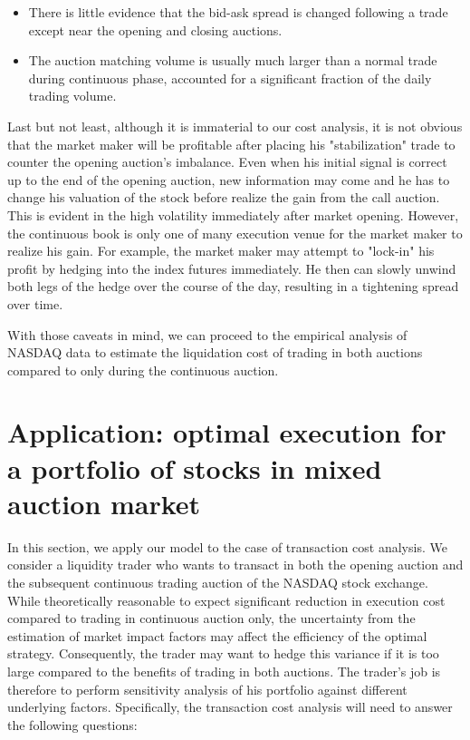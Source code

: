 \documentclass{article}
\begin{document}
\begin{itemize}
  \item There is little evidence that the bid-ask spread is changed following a trade except near the opening and closing auctions.
  \item The auction matching volume is usually much larger than a normal trade during continuous phase, accounted for a significant fraction of the daily trading volume.
\end{itemize}

Last but not least, although it is immaterial to our cost analysis, it is not obvious that the market maker will be profitable after placing his "stabilization" trade to counter the opening auction's imbalance. Even when his initial signal is correct up to the end of the opening auction, new information may come and he has to change his valuation of the stock before realize the gain from the call auction. This is evident in the high volatility immediately after market opening. However, the continuous book is only one of many execution venue for the market maker to realize his gain. For example, the market maker may attempt to "lock-in" his profit by hedging into the index futures immediately. He then can slowly unwind both legs of the hedge over the course of the day, resulting in a tightening spread over time.

With those caveats in mind, we can proceed to the empirical analysis of NASDAQ data to estimate the liquidation cost of trading in both auctions compared to only during the continuous auction.

\section{Application: optimal execution for a portfolio of stocks in mixed auction market}\label{sec:EmpiricalAnalysis}

In this section, we apply our model to the case of transaction cost analysis. We consider a liquidity trader who wants to transact in both the opening auction and the subsequent continuous trading auction of the NASDAQ stock exchange. While theoretically reasonable to expect significant reduction in execution cost compared to trading in continuous auction only, the uncertainty from the estimation of market impact factors may affect the efficiency of the optimal strategy. Consequently, the trader may want to hedge this variance if it is too large compared to the benefits of trading in both auctions. The trader's job is therefore to perform sensitivity analysis of his portfolio against different underlying factors. Specifically, the transaction cost analysis will need to answer the following questions:
\end{document}

